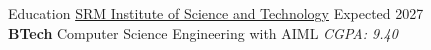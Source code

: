\documentclass{resume} %
\begin{document}















\begin{rSection}{Education}
    \href{https://www.linkedin.com/school/s.r.m.-institute-of-science-&-technology-chennai/}{SRM Institute of Science and Technology} \hfill Expected 2027\\
\textbf{BTech} Computer Science Engineering with AIML \hfill \textit{CGPA: 9.40}
\end{rSection}
\end{document}
